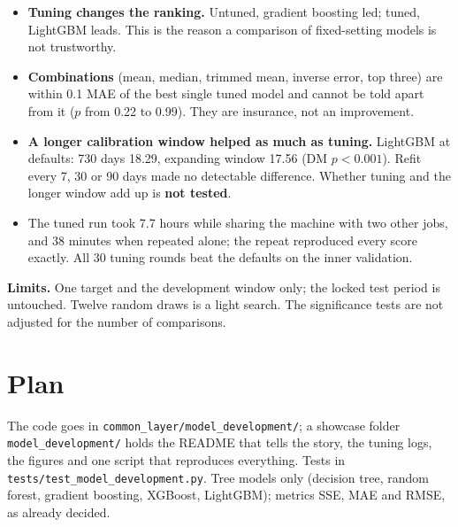 \documentclass[11pt,a4paper]{article}
\newcommand{\notebox}[2]{\par\smallskip\noindent\colorbox{soft}{\parbox{\dimexpr\linewidth-2\fboxsep}{\textbf{#1} #2}}\par}
\begin{document}
\begin{itemize}
\item \textbf{Tuning changes the ranking.} Untuned, gradient boosting led; tuned, LightGBM leads. This is the reason a
      comparison of fixed-setting models is not trustworthy.
\item \textbf{Combinations} (mean, median, trimmed mean, inverse error, top three) are within 0.1 MAE of the best single
      tuned model and cannot be told apart from it ($p$ from 0.22 to 0.99). They are insurance, not an improvement.
\item \textbf{A longer calibration window helped as much as tuning.} LightGBM at defaults: 730 days 18.29, expanding window
      17.56 (DM $p<0.001$). Refit every 7, 30 or 90 days made no detectable difference. Whether tuning and the longer
      window add up is \textbf{not tested}.
\item The tuned run took 7.7 hours while sharing the machine with two other jobs, and 38 minutes when repeated alone; the
      repeat reproduced every score exactly. All 30 tuning rounds beat the defaults on the inner validation.
\end{itemize}

\notebox{Limits.}{One target and the development window only; the locked test period is untouched. Twelve random draws is a
light search. The significance tests are not adjusted for the number of comparisons.}

\section{Plan}

The code goes in \texttt{common\_layer/model\_development/}; a showcase folder \texttt{model\_development/} holds the README
that tells the story, the tuning logs, the figures and one script that reproduces everything. Tests in
\texttt{tests/test\_model\_development.py}. Tree models only (decision tree, random forest, gradient boosting, XGBoost,
LightGBM); metrics SSE, MAE and RMSE, as already decided.
\end{document}
